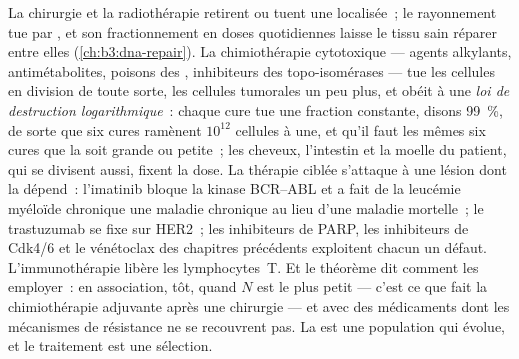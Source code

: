 \begin{example}\label{ex:b3:cancer-biology:therapy}
La chirurgie et la radiothérapie retirent ou tuent une 
localisée~; le rayonnement tue par , et son
fractionnement en doses quotidiennes laisse le tissu sain réparer entre
elles (\cref{ch:b3:dna-repair}). La chimiothérapie cytotoxique ---
agents alkylants, antimétabolites, poisons des ,
inhibiteurs des topo-isomérases --- tue les cellules en division de
toute sorte, les cellules tumorales un peu plus, et obéit à une
\emph{loi de destruction logarithmique}~: chaque cure tue une fraction
constante, disons \qty{99}{\%}, de sorte que six cures ramènent
$10^{12}$ cellules à une, et qu'il faut les mêmes six cures que la
 soit grande ou petite~; les cheveux, l'intestin et la moelle du
patient, qui se divisent aussi, fixent la dose. La thérapie ciblée
s'attaque à une lésion dont la  dépend~: l'imatinib bloque la
kinase BCR--ABL et a fait de la leucémie myéloïde chronique une maladie
chronique au lieu d'une maladie mortelle~; le trastuzumab se fixe sur
HER2~; les inhibiteurs de PARP, les inhibiteurs de Cdk4/6 et le
vénétoclax des chapitres précédents exploitent chacun un défaut.
L'immunothérapie libère les lymphocytes~T. Et le théorème dit comment
les employer~: en association, tôt, quand $N$ est le plus petit ---
c'est ce que fait la chimiothérapie adjuvante après une chirurgie ---
et avec des médicaments dont les mécanismes de résistance ne se
recouvrent pas. La  est une population qui évolue, et le
traitement est une sélection.
\end{example}

